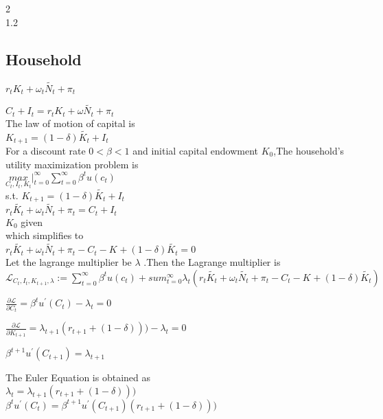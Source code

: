 \documentclass[12pt]{article}
\numberwithin{equation}{subsection} %
\begin{document}
2\\


1.2\\
\subsection{Household}
$r_{t}K_{t}+\omega_{t}\tilde{N_{t}}+\pi_{t}$

$C_{t}+I_{t}=r_{t}K_{t}+\omega \tilde{N_{t}} +\pi_{t}$\\

The law of motion of capital is\\
$K_{t+1}=(1-\delta)\tilde{K_{t}}+I_{t}$\\

For a discount rate $0<\beta<1$ and initial capital endowment $K_{0}$,The household's utility maximization problem is \\

$\underset{C_{t},I_{t},K_{t}}{max}|_{t=0}^{\infty} \sum_{t=0}^{\infty}\beta^{t}u(c_{t})$\\
s.t.
$K_{t+1}=(1-\delta)\tilde{K_{t}}+I_{t}$\\
$r_{t}\tilde{K_{t}}+\omega_{t}\tilde{N_{t}}+\pi_{t}=C_{t}+I_{t}$\\
$K_{0}$ given\\


which simplifies to\\
$r_{t}\tilde{K_{t}}+\omega_{t}\tilde{N_{t}}+\pi_{t}-C_{t}-K_{}+(1-\delta)\tilde{K_{t}}=0$\\

Let the lagrange multiplier be $\lambda$ .Then the Lagrange multiplier is \\

$\mathcal{L}_{C_{t},I_{t},K_{t+1},\lambda}:=\sum_{t=0}^{\infty}\beta^{t}u(c_{t})+sum_{t=0}^{\infty}\lambda_{t}(r_{t}\tilde{K_{t}}+\omega_{t}\tilde{N_{t}}+\pi_{t}-C_{t}-K_{}+(1-\delta)\tilde{K_{t}})$

$\frac{\partial \mathcal{L}}{\partial C_{t}}=\beta ^{t}u^{\prime}(C_{t})-\lambda_{t}=0$

$\frac{\partial \mathcal{L}}{\partial K_{t+1}}=\lambda_{t+1}(r_{t+1}+(1-\delta)))-\lambda_{t}=0$

$\beta^{t+1} u^{\prime}(C_{t+1})=\lambda_{t+1}$

The Euler Equation   is obtained as\\
$\lambda_{t}=\lambda_{t+1}(r_{t+1}+(1-\delta)))$\\

$\beta^{t} u^{\prime}(C_{t})=\beta^{t+1} u^{\prime}(C_{t+1})(r_{t+1}+(1-\delta)))$\\
\end{document}
